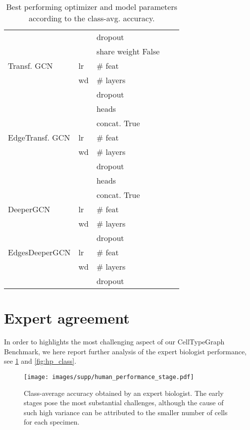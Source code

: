 \documentclass[10pt,twocolumn,letterpaper]{article}
\begin{document}
\begin{table*}[h]
\begin{tabular}{@{}lllcc@{}}
          &               & dropout         &\\
          &               & share weight  False &\\
    \midrule
    Transf. GCN \cite{shi2020masked} & lr  & \# feat       & &  \\
                & wd  & \# layers       &\\
                &               & dropout    &\\
                &               & heads        &\\
                &               & concat.  True  &\\
    \midrule
    EdgeTransf. GCN \cite{shi2020masked} & lr  & \# feat       & &  \\
                    & wd  & \# layers       &\\
                    &               & dropout    &\\
                    &               & heads        &\\
                    &               & concat.  True  &\\
    \midrule
    DeeperGCN \cite{li2020deepergcn} & lr  & \# feat       & &  \\ 
              & wd  & \# layers       &\\
              &               & dropout         &\\
    \midrule
    EdgesDeeperGCN \cite{li2020deepergcn} & lr  & \# feat       &  &  \\
                   & wd        & \# layers       &\\
                   &               & dropout         &\\
    \bottomrule
  \end{tabular}
  \caption{Best performing optimizer and model parameters according to the class-avg. accuracy.}
  \label{tab:full_results}
\end{table*}

\section{Expert agreement}
\label{suppl:experts}
In order to highlights the most challenging aspect of our CellTypeGraph Benchmark, we here report further analysis of the expert biologist performance, see \cref{fig:hp_stage} and \cref{fig:hp_class}.
\begin{figure}
  \centering
  \texttt{[image: images/supp/human\_performance\_stage.pdf]}
  \caption{Class-average accuracy obtained by an expert biologist. The early stages pose the most substantial challenges, although the cause of such high variance can be attributed to the smaller number of cells for each specimen.}
  \label{fig:hp_stage}
\end{figure}
\end{document}
